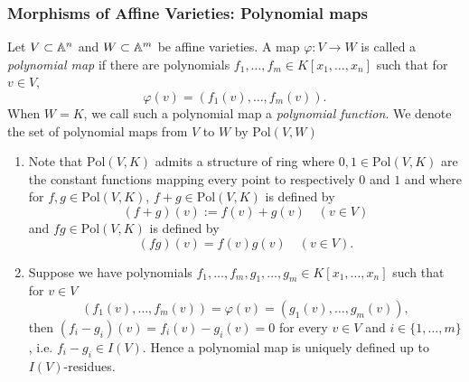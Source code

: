 \subsubsection{Morphisms of Affine Varieties: Polynomial maps}
\begin{definition}
    Let $V\subset \mathbb{A}^n$ and $W\subset \mathbb{A}^m$ be affine varieties. A map $\varphi: V \rightarrow W$ is called a \textit{polynomial map} if there are polynomials $f_1,\dots,f_m\in K[x_1,\dots,x_n]$ such that for $v\in V$, 
    $$\varphi(v) = (f_1(v),\dots,f_m(v)).$$
    When $W=K$, we call such a polynomial map a \textit{polynomial function}. We denote the set of polynomial maps from $V$ to $W$ by $\text{Pol}(V,W)$ 
\end{definition}
\begin{remark}\label{RemarksOnPolynomialMaps}
\begin{enumerate}
    \item Note that $\text{Pol}(V,K)$ admits a structure of ring where $0,1\in \text{Pol}(V,K)$ are the constant functions mapping every point to respectively $0$ and $1$ and where for $f,g\in \text{Pol}(V,K)$, $f+g \in \text{Pol}(V,K)$ is defined by 
    $$(f+g)(v) := f(v) +g(v) \quad (v\in V)$$
    and $fg\in \text{Pol}(V,K)$ is defined by 
    $$(fg)(v) = f(v)g(v)\quad (v\in V).$$
    \item Suppose we have polynomials $f_1,\dots,f_m,g_1,\dots,g_m \in K[x_1,\dots,x_n]$ such that for $v\in V$
    $$(f_1(v),\dots,f_m(v)) = \varphi(v) =(g_1(v),\dots, g_m(v)),$$
    then $(f_i-g_i)(v)=f_i(v)-g_i(v) = 0$ for every $v\in V$ and $i\in\{1,\dots,m\}$, i.e. $f_i-g_i\in I(V)$. Hence a polynomial map is uniquely defined up to $I(V)$-residues. 
\end{enumerate}
\end{remark}
